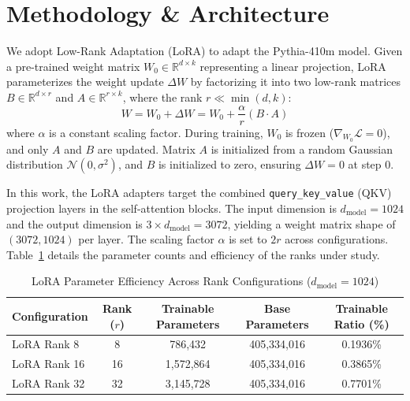 \documentclass[11pt,a4paper]{article}
\begin{document}
\section{Methodology \& Architecture}
We adopt Low-Rank Adaptation (LoRA) to adapt the Pythia-410m model. Given a pre-trained weight matrix $W_0 \in \mathbb{R}^{d \times k}$ representing a linear projection, LoRA parameterizes the weight update $\Delta W$ by factorizing it into two low-rank matrices $B \in \mathbb{R}^{d \times r}$ and $A \in \mathbb{R}^{r \times k}$, where the rank $r \ll \min(d, k)$:
\begin{equation}
W = W_0 + \Delta W = W_0 + \frac{\alpha}{r} (B \cdot A)
\end{equation}
where $\alpha$ is a constant scaling factor. During training, $W_0$ is frozen ($\nabla_{W_0} \mathcal{L} = 0$), and only $A$ and $B$ are updated. Matrix $A$ is initialized from a random Gaussian distribution $\mathcal{N}(0, \sigma^2)$, and $B$ is initialized to zero, ensuring $\Delta W = 0$ at step $0$. 

In this work, the LoRA adapters target the combined \texttt{query\_key\_value} (QKV) projection layers in the self-attention blocks. The input dimension is $d_{\text{model}} = 1024$ and the output dimension is $3 \times d_{\text{model}} = 3072$, yielding a weight matrix shape of $(3072, 1024)$ per layer. The scaling factor $\alpha$ is set to $2r$ across configurations. Table~\ref{tab:param_efficiency} details the parameter counts and efficiency of the ranks under study.

\begin{table}[h]
\centering
\caption{LoRA Parameter Efficiency Across Rank Configurations ($d_{\text{model}} = 1024$)}
\label{tab:param_efficiency}
\begin{tabular}{lcccc}
\toprule
Configuration & Rank ($r$) & Trainable Parameters & Base Parameters & Trainable Ratio (\%) \\
\midrule
LoRA Rank 8  & 8  & 786,432   & 405,334,016 & 0.1936\% \\
LoRA Rank 16 & 16 & 1,572,864 & 405,334,016 & 0.3865\% \\
LoRA Rank 32 & 32 & 3,145,728 & 405,334,016 & 0.7701\% \\
\bottomrule
\end{tabular}
\end{table}
\end{document}
